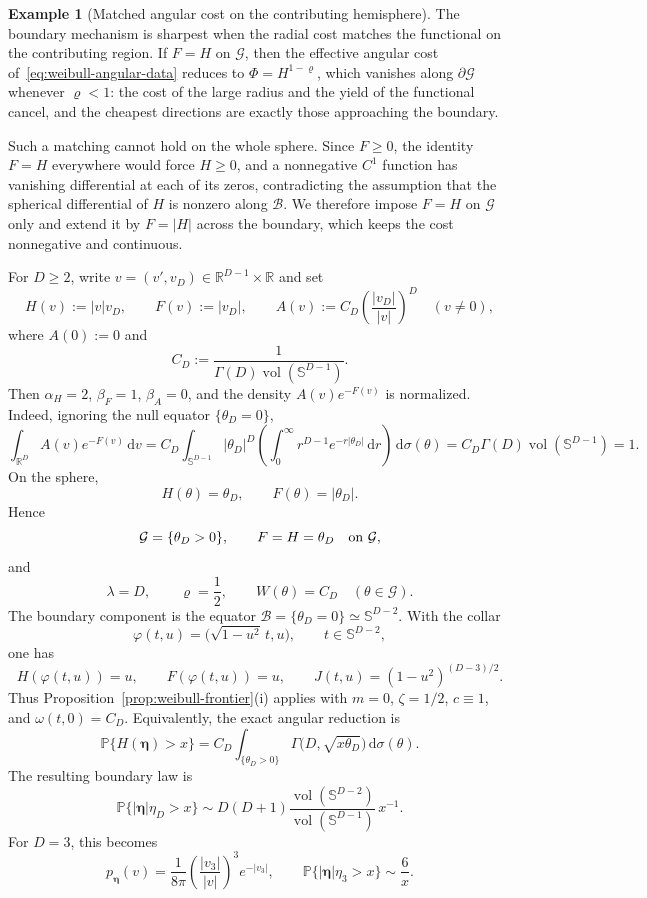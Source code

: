\documentclass[11pt]{amsart}
\numberwithin{equation}{section}
\theoremstyle{definition}
\newtheorem{example}[theorem]{Example}
\theoremstyle{remark}
\newcommand{\R}{\mathbb{R}}
\newcommand{\dd}{\,\mathrm{d}}
\newcommand{\vol}{\operatorname{vol}}
\begin{document}
\begin{example}[Matched angular cost on the contributing hemisphere]
\label{ex:weibull-matched-angular-cost}
The boundary mechanism is sharpest when the radial cost matches the functional
on the contributing region.  If $F=H$ on $\mathcal G$, then the effective
angular cost of~\eqref{eq:weibull-angular-data} reduces to
$\Phi=H^{1-\varrho}$, which vanishes along $\partial\mathcal G$ whenever
$\varrho<1$: the cost of the large radius and the yield of the functional
cancel, and the cheapest directions are exactly those approaching the boundary.

Such a matching cannot hold on the whole sphere.  Since $F\ge0$, the identity
$F=H$ everywhere would force $H\ge0$, and a nonnegative $C^1$ function has
vanishing differential at each of its zeros, contradicting the assumption that
the spherical differential of $H$ is nonzero along $\mathcal B$.  We therefore
impose $F=H$ on $\mathcal G$ only and extend it by $F=|H|$ across the boundary,
which keeps the cost nonnegative and continuous.

For $D\ge2$, write $v=(v',v_D)\in\R^{D-1}\times\R$ and set
\begin{equation}\label{eq:weibull-matched-example-data}
 H(v):=|v|v_D,
 \qquad
 F(v):=|v_D|,
 \qquad
 A(v):=C_D\left(\frac{|v_D|}{|v|}\right)^D
 \quad(v\ne0),
\end{equation}
where $A(0):=0$ and
\[
 C_D:=\frac{1}{\Gamma(D)\vol(\mathbb S^{D-1})}.
\]
Then $\alpha_H=2$, $\beta_F=1$, $\beta_A=0$, and the density
$A(v)e^{-F(v)}$ is normalized.  Indeed, ignoring the null equator
$\{\theta_D=0\}$,
\[
 \int_{\R^D}A(v)e^{-F(v)}\dd v
 =C_D\int_{\mathbb S^{D-1}}|\theta_D|^D
 \left(\int_0^\infty r^{D-1}e^{-r|\theta_D|}\dd r\right)\dd\sigma(\theta)
 =C_D\Gamma(D)\vol(\mathbb S^{D-1})=1.
\]
On the sphere,
\[
 H(\theta)=\theta_D,
 \qquad
 F(\theta)=|\theta_D|.
\]
Hence
\[
 \mathcal G=\{\theta_D>0\},
 \qquad
 F=H=\theta_D\quad\hbox{on }\mathcal G,
\]
and
\[
 \lambda=D,
 \qquad
 \varrho=\frac12,
 \qquad
 W(\theta)=C_D\quad(\theta\in\mathcal G).
\]
The boundary component is the equator
$\mathcal B=\{\theta_D=0\}\simeq\mathbb S^{D-2}$.  With the collar
\[
 \varphi(t,u)=\bigl(\sqrt{1-u^2}\,t,u\bigr),
 \qquad t\in\mathbb S^{D-2},
\]
one has
\[
 H(\varphi(t,u))=u,
 \qquad
 F(\varphi(t,u))=u,
 \qquad
 J(t,u)=(1-u^2)^{(D-3)/2}.
\]
Thus Proposition~\ref{prop:weibull-frontier}(i) applies with
$m=0$, $\zeta=1/2$, $c\equiv1$, and
$\omega(t,0)=C_D$.  Equivalently, the exact angular reduction is
\[
 \mathbb P\{H(\bm\eta)>x\}
 =C_D\int_{\{\theta_D>0\}}
 \Gamma\bigl(D,\sqrt{x\theta_D}\bigr)\dd\sigma(\theta).
\]
The resulting boundary law is
\begin{equation}\label{eq:weibull-matched-example-tail}
 \mathbb P\{|\bm\eta|\eta_D>x\}
 \sim
 D(D+1)\frac{\vol(\mathbb S^{D-2})}{\vol(\mathbb S^{D-1})}\,x^{-1}.
\end{equation}
For $D=3$, this becomes
\[
 p_{\bm\eta}(v)
 =\frac{1}{8\pi}\left(\frac{|v_3|}{|v|}\right)^3e^{-|v_3|},
 \qquad
 \mathbb P\{|\bm\eta|\eta_3>x\}\sim\frac6x.
\]
\end{example}
\end{document}
